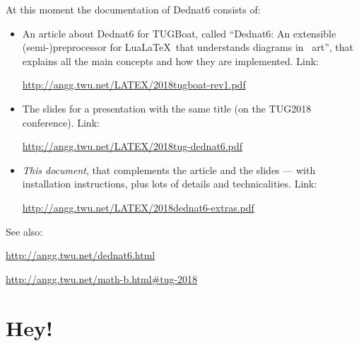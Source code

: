 \documentclass[oneside]{article}
\begin{document}
% 

%

At this moment the documentation of Dednat6 consists of:

\begin{itemize}

\item An article about Dednat6 for TUGBoat, called ``Dednat6: An
  extensible (semi-)preprocessor for Lua\LaTeX\ that understands
  diagrams in \ASCII\ art'', that explains all the main concepts and
  how they are implemented. Link:

  \url{http://angg.twu.net/LATEX/2018tugboat-rev1.pdf}

\item The slides for a presentation with the same title (on the
  TUG2018 conference). Link:

  \url{http://angg.twu.net/LATEX/2018tug-dednat6.pdf}

\item {\sl This document}, that complements the article and the slides
  --- with installation instructions, plus lots of details and
  technicalities. Link:

  \url{http://angg.twu.net/LATEX/2018dednat6-extras.pdf} \\

\end{itemize}

See also:

  \url{http://angg.twu.net/dednat6.html}

  \url{http://angg.twu.net/math-b.html\#tug-2018}



\section{Hey!}
\end{document}
